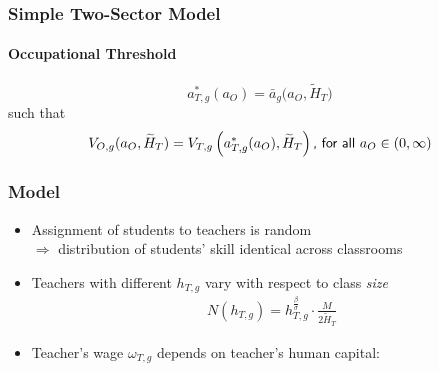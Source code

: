 \documentclass[11pt]{beamer}
\begin{document}
	\begin{frame}
		\frametitle{Simple Two-Sector Model}
		\framesubtitle{Occupational Threshold}
		\begin{equation*}
			a^*_{T,g}(a_O) = \bar{a}_g\big(a_{O},\widetilde{H}_T\big) %
		\end{equation*}
		such that
		\begin{equation}
			\label{eq:indiff}
			V_{O,g}(a_{O},\widetilde{H}_T) = V_{T,g}\left(a^*_{T,g}(a_O),\widetilde{H}_T\right) \textrm{{\sf , for all} } a_O \in (0,\infty) \nonumber
		\end{equation}
	\end{frame}
	
	\begin{frame}
		\frametitle{Model}
			\begin{itemize}
				\item Assignment of students to teachers is random \\ $\Rightarrow$ distribution of students' skill identical across classrooms
				\item Teachers with different $h_{T,g}$ vary with respect to class {\it size}
				\begin{align*}
                    N(h_{T,g})=h_{T,g}^\frac{\beta}{\sigma} \cdot \frac{M}{2\widetilde{H}_T}
				\end{align*}
				\item Teacher's wage $\omega_{T,g}$ depends on teacher's human capital:

\end{itemize}
\end{frame}
\end{document}
